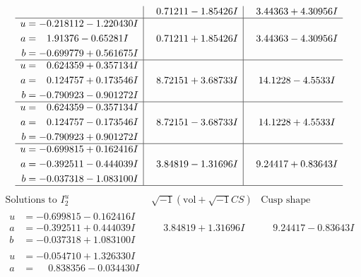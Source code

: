 \documentclass[1p]{elsarticle_modified}
\theoremstyle{definition}
\newcommand{\I}{\sqrt{-1}}
\begin{document}
$$\begin{array}{c|c|c}
 & \phantom{-}0.71211 - 1.85426 I & \phantom{-}3.44363 + 4.30956 I \\ \hline\begin{aligned}
u &= -0.218112 - 1.220430 I \\
a &= \phantom{-}1.91376 - 0.65281 I \\
b &= -0.699779 + 0.561675 I\end{aligned}
 & \phantom{-}0.71211 + 1.85426 I & \phantom{-}3.44363 - 4.30956 I \\ \hline\begin{aligned}
u &= \phantom{-}0.624359 + 0.357134 I \\
a &= \phantom{-}0.124757 + 0.173546 I \\
b &= -0.790923 - 0.901272 I\end{aligned}
 & \phantom{-}8.72151 + 3.68733 I & \phantom{-}14.1228 - 4.5533 I \\ \hline\begin{aligned}
u &= \phantom{-}0.624359 - 0.357134 I \\
a &= \phantom{-}0.124757 - 0.173546 I \\
b &= -0.790923 + 0.901272 I\end{aligned}
 & \phantom{-}8.72151 - 3.68733 I & \phantom{-}14.1228 + 4.5533 I \\ \hline\begin{aligned}
u &= -0.699815 + 0.162416 I \\
a &= -0.392511 - 0.444039 I \\
b &= -0.037318 - 1.083100 I\end{aligned}
 & \phantom{-}3.84819 - 1.31696 I & \phantom{-}9.24417 + 0.83643 I\\
 \hline 
 \end{array}$$\newpage$$\begin{array}{c|c|c}  
\text{Solutions to }I^u_{2}& \I (\text{vol} + \sqrt{-1}CS) & \text{Cusp shape}\\
 \hline 
\begin{aligned}
u &= -0.699815 - 0.162416 I \\
a &= -0.392511 + 0.444039 I \\
b &= -0.037318 + 1.083100 I\end{aligned}
 & \phantom{-}3.84819 + 1.31696 I & \phantom{-}9.24417 - 0.83643 I \\ \hline\begin{aligned}
u &= -0.054710 + 1.326330 I \\
a &= \phantom{-}0.838356 - 0.034430 I \\

\end{aligned}
\end{array}$$
\end{document}
